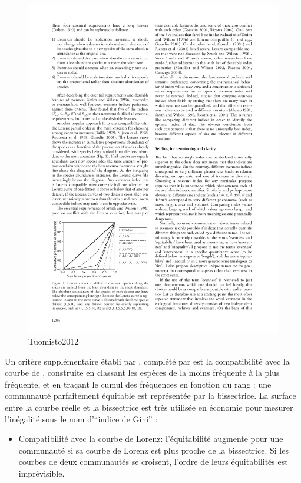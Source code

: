 \documentclass[
  11pt,
  french,
  a4paper,
  extrafontsizes,onecolumn,openright
  ]{memoir}
\providecommand{\tightlist}{%
  \setlength{\itemsep}{0pt}\setlength{\parskip}{0pt}}
\newlength{\rf}
\begin{document}
\scriptsize

\begin{figure}

{\centering \includegraphics[width=0.8\linewidth]{images/Tuomisto2012} 

}

\caption{Tuomisto2012}\label{fig:Tuomisto2012}
\end{figure}

\normalsize

Un critère supplémentaire établi par \textcite{Smith1996}, complété par \textcite{Gosselin2001} est la compatibilité avec la courbe de \textcite{Lorenz1905}, construite en classant les espèces de la moins fréquente à la plus fréquente, et en traçant le cumul des fréquences en fonction du rang \autocite[figure \ref{fig:Tuomisto2012},][]{Tuomisto2012}: une communauté parfaitement équitable est représentée par la bissectrice.
La surface entre la courbe réelle et la bissectrice est très utilisée en économie pour mesurer l'inégalité sous le nom d'``indice de Gini'' \autocite{Gini1912,Ceriani2012}:

\begin{itemize}
\tightlist
\item
  Compatibilité avec la courbe de Lorenz: l'équitabilité augmente pour une communauté si sa courbe de Lorenz est plus proche de la bissectrice.
  Si les courbes de deux communautés se croisent, l'ordre de leurs équitabilités est imprévisible.
\end{itemize}
\end{document}

